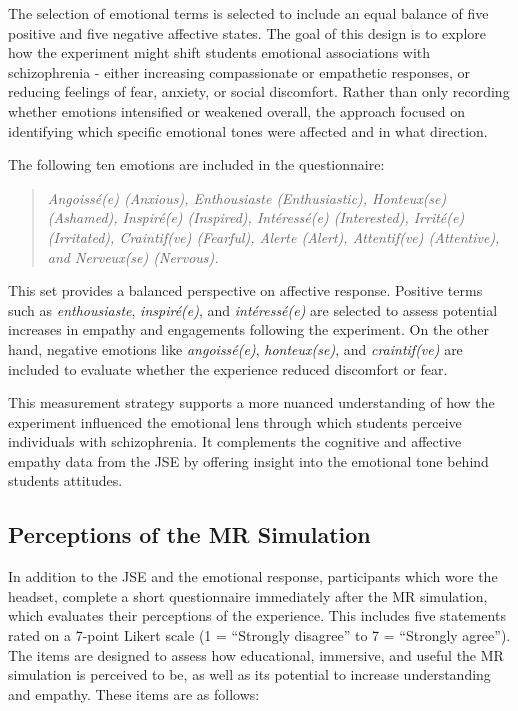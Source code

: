 \vspace{1em}

The selection of emotional terms is selected to include an equal balance of five positive and five negative affective states. The goal of this design is to explore how the experiment might shift students emotional associations with schizophrenia - either increasing compassionate or empathetic responses, or reducing feelings of fear, anxiety, or social discomfort. Rather than only recording whether emotions intensified or weakened overall, the approach focused on identifying which specific emotional tones were affected and in what direction.

The following ten emotions are included in the questionnaire:

\begin{quote}
\textit{Angoissé(e) (Anxious), Enthousiaste (Enthusiastic), Honteux(se) (Ashamed), Inspiré(e) (Inspired), Intéressé(e) (Interested), Irrité(e) (Irritated), Craintif(ve) (Fearful), Alerte (Alert), Attentif(ve) (Attentive), and Nerveux(se) (Nervous).}
\end{quote}

This set provides a balanced perspective on affective response. Positive terms such as \textit{enthousiaste}, \textit{inspiré(e)}, and \textit{intéressé(e)} are selected to assess potential increases in empathy and engagements following the experiment. On the other hand, negative emotions like \textit{angoissé(e)}, \textit{honteux(se)}, and \textit{craintif(ve)} are included to evaluate whether the experience reduced discomfort or fear.

\vspace{1em}

This measurement strategy supports a more nuanced understanding of how the experiment influenced the emotional lens through which students perceive individuals with schizophrenia. It complements the cognitive and affective empathy data from the JSE by offering insight into the emotional tone behind students attitudes.

\subsection{Perceptions of the MR Simulation}

In addition to the JSE and the emotional response, participants which wore the headset, complete a short questionnaire immediately after the MR simulation, which evaluates their perceptions of the experience. This includes five statements rated on a 7-point Likert scale (1 = “Strongly disagree” to 7 = “Strongly agree”). The items are designed to assess how educational, immersive, and useful the MR simulation is perceived to be, as well as its potential to increase understanding and empathy. These items are as follows:

